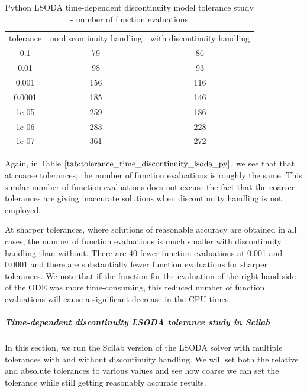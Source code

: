 \begin{table}[H]
\caption {Python LSODA time-dependent discontinuity model tolerance study - number of function evaluations} \label{tab:tolerance_time_discontinuity_lsoda_py} 
\begin{center}
\begin{tabular}{ c c c }
tolerance & no discontinuity handling & with discontinuity handling \\ 
0.1 & 79 & 86 \\
0.01 & 98 & 93 \\
0.001 & 156 & 116 \\
0.0001 & 185 & 146 \\
1e-05 & 259 & 186 \\
1e-06 & 283 & 228 \\
1e-07 & 361 & 272 \\
\end{tabular}
\end{center}
\end{table}
Again, in Table $\ref{tab:tolerance_time_discontinuity_lsoda_py}$, we see that that at coarse tolerances, the number of function evaluations is roughly the same. This similar number of function evaluations does not excuse the fact that the coarser tolerances are giving inaccurate solutions when discontinuity handling is not employed.

At sharper tolerances, where solutions of reasonable accuracy are obtained in all cases, the number of function evaluations is much smaller with discontinuity handling than without. There are 40 fewer function evaluations at 0.001 and 0.0001 and there are substantially fewer function evaluations for sharper tolerances. We note that if the function for the evaluation of the right-hand side of the ODE was more time-consuming, this reduced number of function evaluations will cause a significant decrease in the CPU times.

\subparagraph{Time-dependent  discontinuity LSODA tolerance study in Scilab}
In this section, we run the Scilab version of the LSODA solver with multiple tolerances with and without discontinuity handling. We will set both the relative and absolute tolerances to various values and see how coarse we can set the tolerance while still getting reasonably accurate results.

